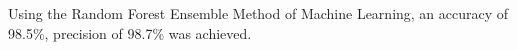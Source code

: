 Using the Random Forest Ensemble Method of Machine Learning, an accuracy of 98.5\%, precision of 98.7\% was achieved.